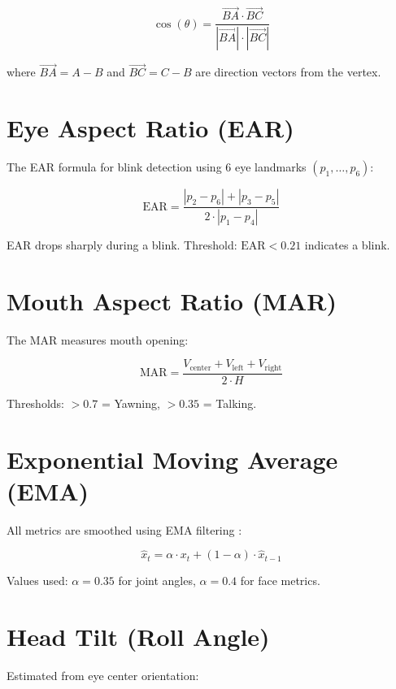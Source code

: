 \documentclass[a4paper,12pt]{report}
\begin{document}
\begin{equation}
    \cos(\theta) = \frac{\vec{BA} \cdot \vec{BC}}{|\vec{BA}| \cdot |\vec{BC}|}
    \label{eq:angle3d}
\end{equation}

where $\vec{BA} = A - B$ and $\vec{BC} = C - B$ are direction vectors from the vertex.

\section{Eye Aspect Ratio (EAR)}
The EAR formula \cite{ear2016} for blink detection using 6 eye landmarks $(p_1, \ldots, p_6)$:

\begin{equation}
    \text{EAR} = \frac{|p_2 - p_6| + |p_3 - p_5|}{2 \cdot |p_1 - p_4|}
    \label{eq:ear}
\end{equation}

EAR drops sharply during a blink. Threshold: $\text{EAR} < 0.21$ indicates a blink.

\section{Mouth Aspect Ratio (MAR)}
The MAR measures mouth opening:

\begin{equation}
    \text{MAR} = \frac{V_{\text{center}} + V_{\text{left}} + V_{\text{right}}}{2 \cdot H}
    \label{eq:mar}
\end{equation}

Thresholds: $> 0.7$ = Yawning, $> 0.35$ = Talking.

\section{Exponential Moving Average (EMA)}
All metrics are smoothed using EMA filtering \cite{ema_filter}:

\begin{equation}
    \hat{x}_t = \alpha \cdot x_t + (1 - \alpha) \cdot \hat{x}_{t-1}
    \label{eq:ema}
\end{equation}

Values used: $\alpha = 0.35$ for joint angles, $\alpha = 0.4$ for face metrics.

\section{Head Tilt (Roll Angle)}
Estimated from eye center orientation:
\end{document}

